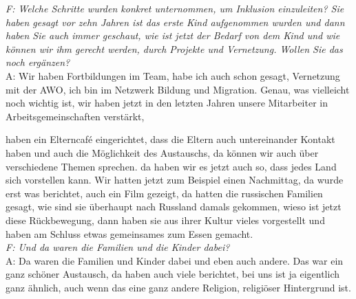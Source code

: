 \begin{linenumbers*}
\emph{F: Welche Schritte wurden konkret unternommen, um Inklusion einzuleiten? Sie haben gesagt vor zehn Jahren ist das erste Kind aufgenommen wurden und dann haben Sie auch immer geschaut, wie ist jetzt der Bedarf von dem Kind und wie können wir ihm gerecht werden, durch Projekte und Vernetzung. Wollen Sie das noch ergänzen?}\\
A: Wir haben Fortbildungen im Team, habe ich auch schon gesagt, Vernetzung mit der AWO, ich bin im Netzwerk Bildung und Migration.
Genau, was vielleicht noch wichtig ist, wir haben jetzt in den letzten Jahren unsere Mitarbeiter in Arbeitsgemeinschaften verstärkt, 

haben ein Elterncafé eingerichtet, dass die Eltern auch untereinander Kontakt haben und auch die Möglichkeit des Austauschs, da können wir auch über verschiedene Themen sprechen. 
da haben wir es jetzt auch so, dass jedes Land sich vorstellen kann. Wir hatten jetzt zum Beispiel einen Nachmittag, da wurde erst was berichtet, auch ein Film gezeigt, da hatten die russischen Familien gesagt, wie sind sie überhaupt nach Russland damals gekommen, wieso ist jetzt diese Rückbewegung, dann haben sie aus ihrer Kultur vieles vorgestellt und haben am Schluss etwas gemeinsames zum Essen gemacht.\\
\emph{F: Und da waren die Familien und die Kinder dabei?}\\
A: Da waren die Familien und Kinder dabei und eben auch andere. Das war ein ganz schöner Austausch, da haben auch viele berichtet, bei uns ist ja eigentlich ganz ähnlich, auch wenn das eine ganz andere Religion, religiöser Hintergrund ist.   


\end{linenumbers*}
